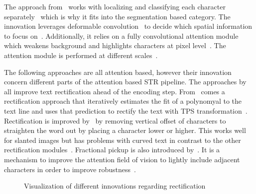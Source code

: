 The approach from~\cite{liao_scene_2018} works with localizing and classifying each character
separately~\citep{liao_scene_2018} which is why it fits into the segmentation based category.
The innovation leverages deformable convolution~\citep{dai_deformable_2017} to decide
which spatial information to focus on~\citep{liao_scene_2018}.
Additionally, it relies on a fully convolutional attention module which weakens background and
highlights characters at pixel level~\citep{liao_scene_2018}.
The attention module is performed at different scales~\citep{liao_scene_2018,xu_show_2016}.

The following approaches are all attention based, however their innovation concern different parts
of the attention based \ac{STR} pipeline.
The approaches by~\cite{zhan_esir_2019,luo_multi-object_2019,shi_aster_2019} all improve
text rectification ahead of the encoding step.
From~\cite{zhan_esir_2019} comes a rectification approach that iteratively estimates the fit of a
polynomyal to the text line and uses that prediction to rectify the text with \ac{TPS}
transformation~\citep{bookstein_principal_1989,zhan_esir_2019}.
Rectification is improved by~\cite{luo_multi-object_2019} by removing vertical offset of characters
to straighten the word out by placing a character lower or higher.
This works well for slanted images but has problems with curved text in contrast to the other
rectification modules~\citep{zhan_esir_2019,liu_star-net_2016,long_scene_2021}.
Fractional pickup is also introduced by~\cite{luo_multi-object_2019}.
It is a mechanism to improve the attention field of vision to lightly include adjacent characters
in order to improve robustness~\citep{luo_multi-object_2019}.
\begin{figure}[hb]
    \centering\scriptsize
    \caption{%
        Visualization of different innovations regarding
        rectification\label{fig:rectification-examples}
    }
\end{figure}
